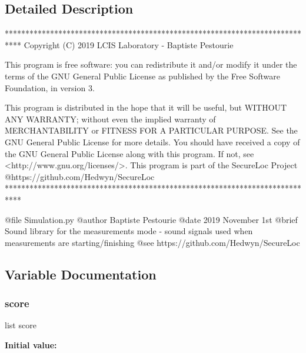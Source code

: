 \subsection{Detailed Description}
\begin{DoxyVerb}****************************************************************************
Copyright (C) 2019 LCIS Laboratory - Baptiste Pestourie

This program is free software: you can redistribute it and/or modify
it under the terms of the GNU General Public License as published by
the Free Software Foundation, in version 3.

This program is distributed in the hope that it will be useful,
but WITHOUT ANY WARRANTY; without even the implied warranty of
MERCHANTABILITY or FITNESS FOR A PARTICULAR PURPOSE. See the
GNU General Public License for more details.
You should have received a copy of the GNU General Public License
along with this program. If not, see <http://www.gnu.org/licenses/>.
This program is part of the SecureLoc Project @https://github.com/Hedwyn/SecureLoc
 ****************************************************************************

@file Simulation.py
@author Baptiste Pestourie
@date 2019 November 1st
@brief Sound library for the measurements mode - sound signals used when measurements are starting/finishing
@see https://github.com/Hedwyn/SecureLoc
\end{DoxyVerb}
 

\subsection{Variable Documentation}
\mbox{\label{namespacesound_aa696113932adb6a0fe9a99b49f87a7f6}} 
\subsubsection{\texorpdfstring{score}{score}}
{\footnotesize\ttfamily list score}

{\bfseries Initial value\+:}
